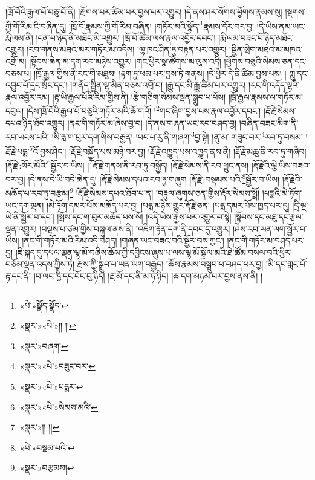 །ཁྲོ་བོའི་རྒྱལ་པོ་བཅུ་བོ་ནི། །རྫོགས་པར་ཚིམ་པར་བྱས་པར་འགྱུར། །དེ་ནས་ཤར་སོགས་ཕྱོགས་རྣམས་སུ། །སྔགས་ཀྱི་གོ་རིམ་ངི་བཞིན་དུ། །ཁྲོ་བོ་རྣམས་ཀྱི་གོ་རིམ་བཞིན། །གཏོར་མའི་སྣོད་\footnote{«པེ་»སྣོད་སྣོད་}རྣམས་དོར་བར་བྱ། །དེ་ཡིས་ནམ་ཡང་རྨི་ལམ་ནི། །ངན་པ་ཉིད་ནི་མཐོང་མི་འགྱུར། །ཁྲོ་བོ་ཚིམ་ལས་རྣལ་འབྱོར་དབང་། །རྨི་ལམ་བཟང་པོ་ཉིད་མཐོང་འགྱུར། །རབ་གནས་མཐའ་མར་གཏོར་མ་འདིས། །ལྷ་ཁང་ཤིན་ཏུ་བརྟན་པར་འགྱུར། །སྦྱིན་སྲེག་མཐའ་མ་མཁའ་འགྲོ་མ། །སྟོབས་ཆེན་མ་དག་རབ་མཉེས་འགྱུར། །གང་ཕྱིར་སྣ་ཚོགས་མ་ལུས་འདི། །ཕྱོགས་བཅུའི་སེམས་ཅན་དང་བཅས་པ། །ཁྲོ་རྒྱལ་གྱིས་ནི་རང་གི་མཐུས། །རྟག་ཏུ་ཕམ་པར་བྱས་ཏེ་གནས། །དེ་ཕྱིར་དེ་ནི་ཚིམ་བྱས་པས། །
ཀླུ་དང་འབྱུང་པོ་དྲང་སྲོང་དང་། །གནོད་སྦྱིན་ལྷ་མིན་བཅས་འགྲོ་བ། །རྒྱུ་དང་མི་རྒྱུ་ཚིམ་པར་འགྱུར། །རང་གི་འདོད་ལྷའི་རྣལ་འབྱོར་རམ། །རྟ་ཡི་རྒྱལ་པོའི་རིམ་གྱིས་ནི། །རྩེ་གཅིག་སེམས་ལྡན་སྒྲུབ་པ་པོས། །ཁྲོ་རྒྱལ་རྣམས་ལ་གཏོར་མ་དབུལ། །དེས་ཁྲོ་བོའི་རྒྱལ་པོ་བཅུའི་གཏོར་མའི་ཆོ་གའོ། །\footnote{«སྣར་»«པེ་»།། །།}གང་ཞིག་བྱས་པས་རྣལ་འབྱོར་དབང་། །རྡོ་རྗེ་སེམས་དཔའ་ཉིད་ཐོབ་འགྱུར། །ནང་གི་གཏོར་མ་ཞེས་བྱ་བ། །དེ་ནས་གཞན་ཡང་རབ་བཤད་བྱ། །བཞིན་བཟང་མིག་ནི་རབ་ཡངས་པའི། །སི་ཧླ་ག་པུར་དག་གིས་བརྒྱན། །པང་པ་རུ་ནི་གཞག་\footnote{«སྣར་»བཞག་}བྱ་སྟེ། །ནུ་མ་:གཟུང་བར་\footnote{«སྣར་»«པེ་»བཟུང་བར་}རབ་ཏུ་བསམ། །རྡོ་རྗེ་པདྨ་\footnote{«སྣར་»«པེ་»པདྨར་}འོ་བྱས་ཤིང་། །རྡོ་རྗེ་བསྐྱོད་པས་མཉེ་བར་བྱ། །རྡོ་རྗེ་འཁྱུད་པས་འཁྱུད་ནས་ནི། །རྡོ་རྗེ་མཆུ་ནི་རབ་ཏུ་གཞིབ། །རྡོ་རྗེ་:སོར་མོའི་\footnote{«སྣར་»«པེ་»སེམས་མའི་}སྦྱོར་བ་ཡིས། །\footnote{«སྣར་»།། །།}རྡོ་རྗེ་གནས་ནི་རབ་ཏུ་བསྐྱོད། །རྡོ་རྗེ་སེམས་ནི་རབ་ཕྱུང་ནས། །རྡོ་རྗེའི་ལྕེ་ཡིས་བཟའ་བར་བྱ། །དེ་ནས་དེ་ཡི་བདེ་ཆེན་དུ། །རྡོ་རྗེ་སེམས་དཔའ་རབ་ཏུ་གཞུག །རྡོ་རྗེ་:བསྡམས་པའི་\footnote{«པེ་»བསྡམ་པའི་}སྦྱོར་བ་ཡིས། །རྡོ་རྗེའི་མཆོད་པ་རབ་ཏུ་བརྩམ།\footnote{«སྣར་»བརྩམས།} །རྡོ་རྗེ་སེམས་དཔའ་ཐོབ་པ་ན། །བརྟུལ་ཞུགས་ཅན་གྱིས་རྡོར་སེམས་སྤྲོ། །པདྨའི་མེ་ཏོག་ཡང་དག་ལྡན། །མེ་ཏོག་དམར་པོས་མཆོད་པར་བྱ། །པདྨ་མཉེས་གྱུར་རྡོ་རྗེ་ཅན། །པདྨ་དམར་པོས་ཁྱད་པར་དུ། །དྲི་ལྔ་ཡི་ནི་སྦྱོར་བ་དང་། །སྤོས་དང་ག་བུར་མཆོད་པས་སོ། །འདི་ཡིས་རྒྱས་པར་འགྱུར་བ་སྟེ། །སྟོབས་དང་མཐུ་དང་རྩལ་ལྡན་འགྱུར། །བལྟས་པ་ཙམ་གྱིས་བསྐུལ་ནས་ནི། །འཇིག་རྟེན་དག་ནི་དབང་དུ་འགྱུར། །ཤེས་རབ་ཡན་ལག་སྦྱོར་བ་ཡིས། །ནང་གི་གཏོར་མའི་རིམ་འདི་བཤད། །གཞན་ཡང་བཟའ་བའི་སྦྱོར་བས་ཀྱང་། །ནང་གི་གཏོར་མ་བཤད་པར་བྱ། །ཇི་སྐད་དུ་དཔལ་ལྡན་ལྷ་མོ་བཞིས་ཆོས་ཀྱི་དབྱིངས་ཞུས་པ་ལས་ལྷ་མོ་སྒྲོལ་མའི་ཐེ་ཚོམ་བསལ་བའི་ཕྱིར་བཅོམ་ལྡན་འདས་ཀྱིས་ཏེ། རྫས་ཀྱི་སྒྲུབ་པ་ཡན་ལག་བརྒྱད། །ཆོས་རྣམས་བསྒྲུབ་པ་བཤད་པར་བྱ། །མི་དང་གླང་པོ་རྟ་དང་ནི། །བ་ལང་ཁྱི་དང་བོང་བུ་ཉིད། །རྔ་མོ་དང་ནི་མ་ཧེ་ཉིད། །ཆ་དག་མཉམ་པར་བྱས་ནས་ནི། །
